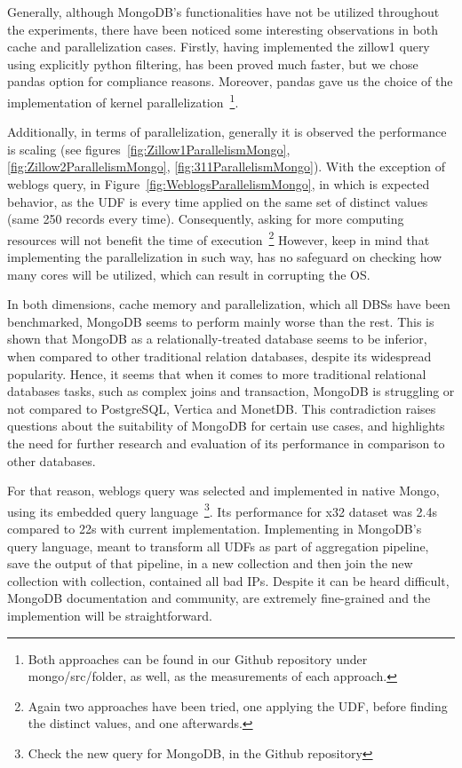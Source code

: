 
Generally, although MongoDB's functionalities have not be utilized throughout the 
experiments, there have been noticed some interesting observations in both cache and
parallelization cases. 
Firstly, having implemented the zillow1 query using explicitly 
python filtering, has been proved much faster, but we chose pandas option
for compliance reasons. Moreover, pandas gave us the choice of the 
implementation of kernel parallelization~\footnote{Both approaches can be found in our Github repository
under mongo/src/folder, as well, as the measurements of each approach.}. 

Additionally, in terms of parallelization, generally it is observed
the performance is scaling (see figures~\ref{fig:Zillow1ParallelismMongo}, 
\ref{fig:Zillow2ParallelismMongo}, \ref{fig:311ParallelismMongo}). 
With the exception of weblogs query, in Figure~\ref{fig:WeblogsParallelismMongo}, 
in which is expected behavior, as the UDF is every time applied on the same 
set of distinct values (same 250 records every time). Consequently, asking 
for more computing resources will not benefit the time of execution~\footnote{Again two approaches
have been tried, one applying the UDF, before finding the distinct values, and one 
afterwards.}
However, keep in mind that implementing the parallelization in such way, has no safeguard on checking 
how many cores will be utilized, which can result in corrupting the OS. 

In both dimensions, cache memory and parallelization, which all DBSs have been 
benchmarked, MongoDB seems to perform mainly worse than the rest. This is 
shown that MongoDB as a relationally-treated database seems to be inferior, 
when compared to other traditional relation databases, despite its widespread
popularity. Hence, it seems that when it comes to more
traditional relational databases tasks, such as complex joins and transaction, 
MongoDB is struggling or not compared to PostgreSQL, Vertica and MonetDB. 
This contradiction raises questions about the suitability of MongoDB for certain use cases, 
and highlights the need for further research and evaluation of its performance in comparison 
to other databases. 

For that reason, weblogs query was selected and implemented in native Mongo, using its 
embedded query language~\footnote{Check the new query for MongoDB, in the Github repository}.
Its performance for x32 dataset was 2.4s compared to 22s
with current implementation. Implementing in MongoDB's query language, meant to transform 
all UDFs as part of aggregation pipeline, save the output of that pipeline, in a new
collection and then join the new collection with collection, contained all bad IPs. 
Despite it can be heard difficult, MongoDB documentation and community, are 
extremely fine-grained and the implemention will be straightforward. 


